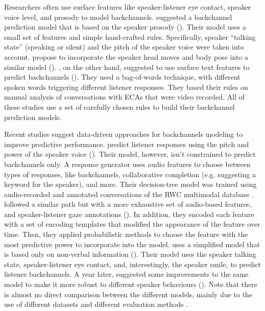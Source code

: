 \documentclass[]{simple-thesis}
\begin{document}
Researchers often use surface features like speaker-listener eye contact, speaker voice level, and prosody to model backchannels.
\citeauthor{Ward2000} suggested a backchannel prediction model that is based on the speaker prosody (\citeyear{Ward2000}).
Their model uses a small set of features and simple hand-crafted rules.
Specifically, speaker ``talking state'' (speaking or silent) and the pitch of the speaker voice were taken into account.
\citeauthor{Gratch2006} propose to incorporate the speaker head moves and body pose into a similar model (\citeyear{Gratch2006}).
\citeauthor{Lee2006}, on the other hand, suggested to use surface text features to predict backchannels (\citeyear{Lee2006}).
They used a bag-of-words technique, with different spoken words triggering different listener responses.
They based their rules on manual analysis of conversations with ECAs that were video recorded.
All of these studies use a set of carefully chosen rules to build their backchannel prediction models.

Recent studies suggest data-driven approaches for backchannels modeling to improve predictive performance.
\citeauthor{Nishimura2007} predict listener responses using the pitch and power of the speaker voice (\citeyear{Nishimura2007}).
Their model, however, isn't constrained to predict backchannels only.
A response generator uses audio features to choose between types of responses, like backchannels, collaborative completion (e.g. suggesting a keyword for the speaker), and more.
Their decision-tree model was trained using audio-recorded and annotated conversations of the RWC multimodal database \citep{Hayamizu1996}.
\citeauthor{Morency2008} followed a similar path but with a more exhaustive set of audio-based features, and speaker-listener gaze annotations (\citeyear{Morency2008}).
In addition, they encoded each feature with a set of encoding templates that modified the appearance of the feature over time.
Then, they applied probabilistic methods to choose the feature with the most predictive power to incorporate into the model.
\citeauthor{Huang2011} uses a simplified model that is based only on non-verbal information (\citeyear{Huang2011}).
Their model uses the speaker talking state, speaker-listener eye contact, and, interestingly, the speaker smile, to predict listener backchannels.
A year later, \citeauthor{Kok2012} suggested some improvements to the same model to make it more robust to different speaker behaviours (\citeyear{Kok2012}).
Note that there is almost no direct comparison between the different models, mainly due to the use of different datasets and different evaluation methods \citep{Morency2008}.
\end{document}
